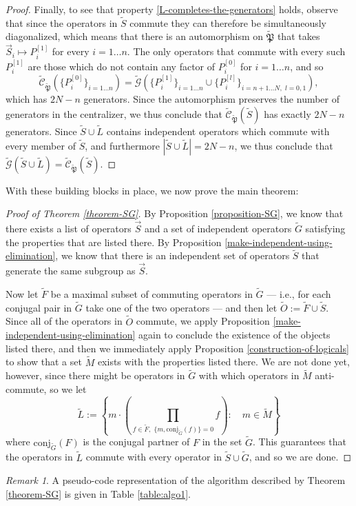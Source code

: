 \documentclass[12pt]{amsbook}
\theoremstyle{plain}
\theoremstyle{definition}
\theoremstyle{remark}
\newtheorem{remark}{Remark}
\newcommand{\lst}{\vec}
\newcommand{\set}{\tilde}
\newcommand{\genfun}{\tilde{\mathcal{G}}}
\newcommand{\pauligroup}{{\set{\mathfrak{P}}}}
\newcommand{\centralizer}{\set{\mathcal{C}}}
\newcommand{\paren}[1]{\left(#1\right)}
\begin{document}
\begin{proof}
Finally, to see that property \ref{L-completes-the-generators} holds, observe that since the operators in $\set S$ commute they can therefore be simultaneously diagonalized, which means that there is an automorphism on $\pauligroup$ that takes $\lst S_i\mapsto P_i^{[1]}$ for every $i=1 \dots n$.  The only operators that commute with every such $P_i^{[1]}$ are those which do not contain any factor of $P_i^{[0]}$ for $i=1 \dots n$, and so $$\centralizer_\pauligroup\paren{\{P_i^{[0]}\}_{i=1\dots n}} = \genfun\paren{\{P_i^{[1]}\}_{i=1 \dots n}\cup \{P_i^{[l]}\}_{i=n+1 \dots N, \,\, l=0,1}},$$ which has $2N-n$ generators.  Since the automorphism preserves the number of generators in the centralizer, we thus conclude that $\centralizer_\pauligroup(\set S)$ has exactly $2N-n$ generators.  Since $\set S\cup\set L$ contains independent operators which commute with every member of $\set S$, and furthermore $|\set S\cup\set L|=2N-n$, we thus conclude that $\genfun\paren{\set S\cup\set L}=\centralizer_\pauligroup(\set S)$.
\end{proof}
With these building blocks in place, we now prove the main theorem:

\begin{proof}[Proof of Theorem \ref{theorem-SG}]
By Proposition \ref{proposition-SG}, we know that there exists a list of operators $\lst S$ and a set of independent operators $\set G$ satisfying the properties that are listed there.  By Proposition \ref{make-independent-using-elimination}, we know that there is an independent set of operators $\set S$ that generate the same subgroup as $\lst S$.  

Now let $\set F$ be a maximal subset of commuting operators in $\set G$ --- i.e., for each conjugal pair in $\set G$ take one of the two operators --- and then let $\set O := \set F \cup \set S$.  Since all of the operators in $\set O$ commute, we apply Proposition \ref{make-independent-using-elimination} again to conclude the existence of the objects listed there, and then we immediately apply Proposition \ref{construction-of-logicals} to show that a set $\set M$ exists with the properties listed there.  We are not done yet, however, since there might be operators in $\set G$ with which operators in $\set M$ anti-commute, so we let
$$\set L := \left\{m\cdot\paren{\prod_{f\in \set F,\,\,\{m,\text{conj}_{\set G}(f)\}=0} f }:\quad m \in\set M\right\}$$
where $\text{conj}_{\set G}(F)$ is the conjugal partner of $F$ in the set $\set G$.  This guarantees that the operators in $\set L$ commute with every operator in $\set S\cup\set G$, and so we are done.
\end{proof}
\begin{remark}
A pseudo-code representation of the algorithm described by Theorem \ref{theorem-SG} is given in Table \ref{table:algo1}.
\end{remark}
\end{document}
